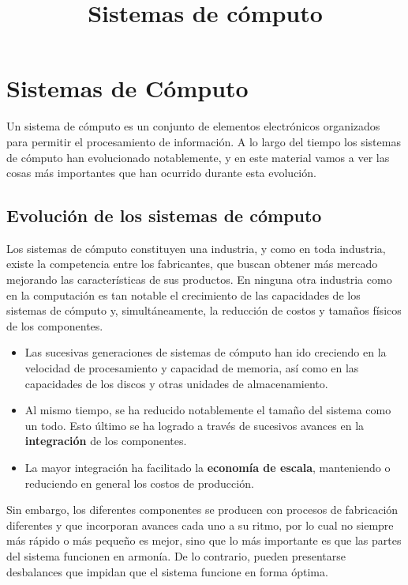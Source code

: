 \documentclass[spanish,A4,]{article}
\title{Sistemas de cómputo}
\begin{document}
\maketitle

\section{Sistemas de Cómputo}\label{sistemas-de-cuxf3mputo}

Un sistema de cómputo es un conjunto de elementos electrónicos
organizados para permitir el procesamiento de información. A lo largo
del tiempo los sistemas de cómputo han evolucionado notablemente, y en
este material vamos a ver las cosas más importantes que han ocurrido
durante esta evolución.

\subsection{Evolución de los sistemas de
cómputo}\label{evoluciuxf3n-de-los-sistemas-de-cuxf3mputo}

Los sistemas de cómputo constituyen una industria, y como en toda
industria, existe la competencia entre los fabricantes, que buscan
obtener más mercado mejorando las características de sus productos. En
ninguna otra industria como en la computación es tan notable el
crecimiento de las capacidades de los sistemas de cómputo y,
simultáneamente, la reducción de costos y tamaños físicos de los
componentes.

\begin{itemize}
\itemsep1pt\parskip0pt
\item
  Las sucesivas generaciones de sistemas de cómputo han ido creciendo en
  la velocidad de procesamiento y capacidad de memoria, así como en las
  capacidades de los discos y otras unidades de almacenamiento.
\item
  Al mismo tiempo, se ha reducido notablemente el tamaño del sistema
  como un todo. Esto último se ha logrado a través de sucesivos avances
  en la \textbf{integración} de los componentes.
\item
  La mayor integración ha facilitado la \textbf{economía de escala},
  manteniendo o reduciendo en general los costos de producción.
\end{itemize}

Sin embargo, los diferentes componentes se producen con procesos de
fabricación diferentes y que incorporan avances cada uno a su ritmo, por
lo cual no siempre más rápido o más pequeño es mejor, sino que lo más
importante es que las partes del sistema funcionen en armonía. De lo
contrario, pueden presentarse desbalances que impidan que el sistema
funcione en forma óptima.
\end{document}
